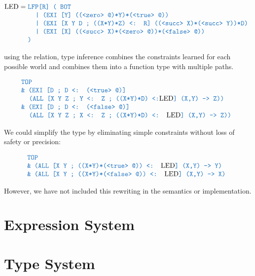 \documentclass[acmsmall]{acmart}
\theoremstyle{definition}
\begin{document}
\[
  \text{LED} = 
  \begin{array}[t]{@{} l}
      \J{LFP[R] ( BOT}
      \\
      \I \J{| (EXI [Y] ((<zero> @)*Y)*(<true> @))}
      \\
      \I \J{| (EXI [X Y D ; ((X*Y)*Z) <: R] ((<succ> X)*(<succ> Y))*D)}
      \\
      \I \J{| (EXI [X] ((<succ> X)*(<zero> @))*(<false> @))}
      \\
      \J{)}
  \end{array}
\]

using the  relation, type inference combines the constraints learned
for each possible world and combines them into a function type with multiple paths. 

\[
  \begin{array}[t]{@{} l}
    \J{TOP}
    \\
    \J{\& (EXI [D ; D <: (<true> @)]}
    \\
    \I \J{(ALL [X Y Z ; Y <: Z ; ((X*Y)*D) <:}\text{LED}\J{] (X,Y) -> Z))}
    \\
    \J{\& (EXI [D ; D <: (<false> @)]}
    \\
    \I \J{(ALL [X Y Z ; X <: Z ; ((X*Y)*D) <: }\text{LED}\J{] (X,Y) -> Z))}
  \end{array}
\]

We could simplify the type by eliminating simple constraints without loss of safety or precision:

\[
  \begin{array}[t]{@{} l}
    \J{TOP}
    \\
    \J{\& (ALL [X Y ; ((X*Y)*(<true> @)) <: }\text{LED}\J{] (X,Y) -> Y)}
    \\
    \J{\& (ALL [X Y ; ((X*Y)*(<false> @)) <: }\text{LED}\J{] (X,Y) -> X)}
  \end{array}
\]

However, we have not included this rewriting in the semantics or implementation. 


\section{Expression System}

\section{Type System}
\end{document}

